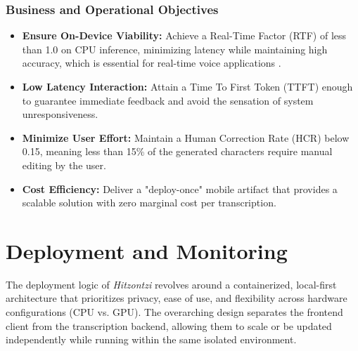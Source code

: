\documentclass[12pt]{article}
\begin{document}
\subsubsection{Business and Operational Objectives}
\begin{itemize}
    \item \textbf{Ensure On-Device Viability:} Achieve a Real-Time Factor (RTF) of less than 1.0 on CPU inference, minimizing latency while maintaining high accuracy, which is essential for real-time voice applications \cite{ieee2025}.
    \item \textbf{Low Latency Interaction:} Attain a Time To First Token (TTFT) enough to guarantee immediate feedback and avoid the sensation of system unresponsiveness.
    \item \textbf{Minimize User Effort:} Maintain a Human Correction Rate (HCR) below 0.15, meaning less than 15\% of the generated characters require manual editing by the user.
    \item \textbf{Cost Efficiency:} Deliver a "deploy-once" mobile artifact that provides a scalable solution with zero marginal cost per transcription.
\end{itemize}




\section{Deployment and Monitoring}

The deployment logic of \textit{Hitzontzi} revolves around a containerized, local-first architecture that prioritizes privacy, ease of use, and flexibility across hardware configurations (CPU vs. GPU). The overarching design separates the frontend client from the transcription backend, allowing them to scale or be updated independently while running within the same isolated environment.
\end{document}

